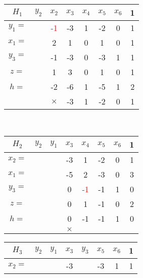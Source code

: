 \begin{example}
\begin{minipage}[c]{0.5\textwidth}
\begin{center}
		\end{center}
	\end{minipage}
	\begin{minipage}[c]{0.5\textwidth}
		\begin{center}
			\begin{tabular}{c|cccccc|c}
				$H_1$ & $y_2$ & $x_2$ & $x_3$ & $x_4$ & $x_5$ & $x_6$ & 1 \\
				\hline
				$y_1 = $ &  & \textcolor{red}{-1} & -3 & 1 & -2 & 0 & 1 \\
				$x_1 = $ &  & 2 & 1 & 0 & 1 & 0 & 1 \\
				$y_3 = $ &  & -1 & -3 & 0 & -3 & 1 & 1 \\
				\hline
				$z = $ &  & 1 & 3 & 0 & 1 & 0 & 1 \\
				\hline
				$h= $ &  & -2 & -6 & 1 & -5 & 1 & 2 \\
				\hline 
				&  & $\times$ & -3 & 1 & -2 & 0 & 1 \\
			\end{tabular}
		\end{center}
	\end{minipage} \\
	\begin{minipage}[c]{0.5\textwidth}
		\begin{center}
			\begin{tabular}{c|cccccc|c}
				$H_2$ & $y_2$ & $y_1$ & $x_3$ & $x_4$ & $x_5$ & $x_6$ & 1 \\
				\hline
				$x_2 = $ & &  & -3 & 1 & -2 & 0 & 1 \\
				$x_1 = $ &  &  & -5 & 2 & -3 & 0 & 3 \\
				$y_3 = $ &  &  & 0 & \textcolor{red}{-1} & -1 & 1 & 0 \\
				\hline
				$z = $ &  &  & 0 & 1 & -1 & 0 & 2 \\
				\hline
				$h= $ &  &  & 0 & -1 & -1 & 1 & 0 \\
				\hline 
				&  &  & $\times$ &  &  &  &  \\
			\end{tabular}
		\end{center}
	\end{minipage}
	\begin{minipage}[c]{0.5\textwidth}
		\begin{center}
			\begin{tabular}{c|cccccc|c}
				$H_3$ & $y_2$ & $y_1$ & $x_3$ & $y_3$ & $x_5$ & $x_6$ & 1 \\
				\hline
				$x_2 = $ & &  & -3 &  & -3 & 1 & 1 \\

\end{tabular}
\end{center}
\end{minipage}
\end{example}
